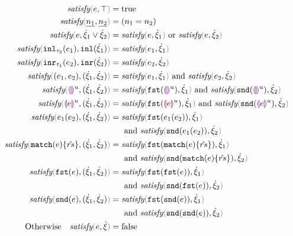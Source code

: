 \begin{subequations}\label{defn:satisfy}
\begin{align}
  \fsatisfy{e}{\ctruth} ={}& \true \label{defn:satisfy-truth}\\
  \fsatisfy{\hnum{n_1}}{\cnum{n_2}} ={}& (n_1 = n_2) \label{defn:num-satisfy-num}\\
  \fsatisfy{e}{\cor{\hxi_1}{\hxi_2}} ={}& \fsatisfy{e}{\hxi_1} \text{ or } \fsatisfy{e}{\hxi_2} \label{defn:satisfy-or}\\
  \fsatisfy{\hinl{\tau_2}{e_1}}{\cinl{\hxi_1}} ={}& \fsatisfy{e_1}{\hxi_1} \label{defn:inl-satisfy-inl}\\
  \fsatisfy{\hinr{\tau_1}{e_2}}{\cinr{\hxi_2}} ={}& \fsatisfy{e_2}{\hxi_2} \label{defn:inr-satisfy-inr}\\
  \fsatisfy{\hpair{e_1}{e_2}}{\cpair{\hxi_1}{\hxi_2}} ={}& \fsatisfy{e_1}{\hxi_1} \text{ and } \fsatisfy{e_2}{\hxi_2} \label{defn:pair-satisfy-pair}\\
  \fsatisfy{\hehole{u}}{\cpair{\hxi_1}{\hxi_2}} ={}& \fsatisfy{\hfst{\hehole{u}}}{\hxi_1} \text{ and } \fsatisfy{\hsnd{\hehole{u}}}{\hxi_2}
  \label{defn:ehole-satisfy-pair} \\
  \fsatisfy{\hhole{e}{u}}{\cpair{\hxi_1}{\hxi_2}} ={}& \fsatisfy{\hfst{\hhole{e}{u}}}{\hxi_1} \text{ and } \fsatisfy{\hsnd{\hhole{e}{u}}}{\hxi_2}
  \label{defn:hole-satisfy-pair} \\
  \fsatisfy{\hap{e_1}{e_2}}{\cpair{\hxi_1}{\hxi_2}} ={}& \fsatisfy{\hfst{\hap{e_1}{e_2}}}{\hxi_1} \notag\\
  &\text{ and } \fsatisfy{\hsnd{\hap{e_1}{e_2}}}{\hxi_2}
  \label{defn:ap-satisfy-pair} \\
  \fsatisfy{\hmatch{e}{\zrules}}{\cpair{\hxi_1}{\hxi_2}} ={}& \fsatisfy{\hfst{\hmatch{e}{\zrules}}}{\hxi_1} \notag\\
  &\text{ and } \fsatisfy{\hsnd{\hmatch{e}{\zrules}}}{\hxi_2}
  \label{defn:match-satisfy-pair} \\
  \fsatisfy{\hfst{e}}{\cpair{\hxi_1}{\hxi_2}} ={}& \fsatisfy{\hfst{\hfst{e}}}{\hxi_1} \notag\\
  &\text{ and } \fsatisfy{\hsnd{\hfst{e}}}{\hxi_2}
  \label{defn:fst-satisfy-pair} \\
  \fsatisfy{\hsnd{e}}{\cpair{\hxi_1}{\hxi_2}} ={}& \fsatisfy{\hfst{\hsnd{e}}}{\hxi_1} \notag\\
  &\text{ and } \fsatisfy{\hsnd{\hsnd{e}}}{\hxi_2}
  \label{defn:snd-satisfy-pair} \\
  \text{Otherwise}\quad \fsatisfy{e}{\hxi} ={}& \false \label{defn:not-satisfy}
\end{align}
\end{subequations}

